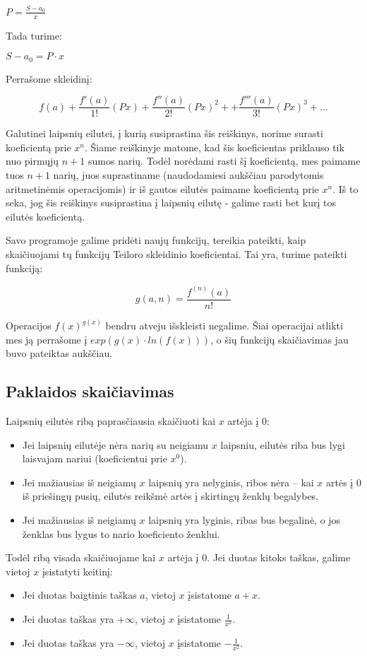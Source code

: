 	$P = \frac{S - a_0}{x}$
	
	Tada turime: 
	
	$S - a_0 = P \cdotp x$
	
	Perrašome skleidinį:
	
	\[f(a) + \frac{f'(a)}{1!}(Px)+\frac{f''(a)}{2!}(Px)^2 + +\frac{f'''(a)}{3!}(Px)^3 + ...\]
	
	Galutinei laipsnių eilutei, į kurią susiprastina šis reiškinys, norime surasti koeficientą prie $x^n$. 
	Šiame reiškinyje matome, kad šis koeficientas priklauso tik nuo pirmųjų $n+1$ sumos narių. 
	Todėl norėdami rasti šį koeficientą, mes paimame tuos $n+1$ narių, juos suprastiname (naudodamiesi aukščiau parodytomis aritmetinėmis operacijomis) 
	ir iš gautos eilutės paimame koeficientą prie $x^n$. 
	Iš to seka, jog šis reiškinys susiprastina į laipsnių eilutę - galime rasti bet kurį tos eilutės koeficientą.
	
	Savo programoje galime pridėti naujų funkcijų, tereikia pateikti, kaip skaičiuojami tų funkcijų Teiloro skleidinio koeficientai. 
	Tai yra, turime pateikti funkciją: 
	
	\[ g(a,n) = \frac{f^{(n)}(a)}{n!}\]
    
    Operacijos $f(x)^{g(x)}$ bendru atveju išskleisti negalime. Šiai operacijai atlikti mes ją perrašome į $exp(g(x) \cdotp ln(f(x)))$,
    o šių funkcijų skaičiavimas jau buvo pateiktas aukščiau.

\subsection{Paklaidos skaičiavimas}
	Laipsnių eilutės ribą paprasčiausia skaičiuoti kai $x$ artėja į 0:
	\begin{itemize}
		\item Jei laipsnių eilutėje nėra narių su neigiamu $x$ laipsniu, eilutės riba bus lygi laisvajam nariui
			(koeficientui prie $x^0$).
		\item Jei mažiausias iš neigiamų $x$ laipsnių yra nelyginis, ribos nėra -- kai $x$ artės į 0 iš priešingų pusių,
			eilutės reikšmė artės į skirtingų ženklų begalybes.
		\item Jei mažiausias iš neigiamų $x$ laipsnių yra lyginis, ribas bus begalinė, o jos ženklas bus lygus to nario
			koeficiento ženklui.
	\end{itemize}

	
	Todėl ribą visada skaičiuojame kai $x$ artėja į 0. Jei duotas kitoks taškas, galime vietoj $x$ įsistatyti keitinį:
	\begin{itemize}
		\item Jei duotas baigtinis taškas $a$, vietoj $x$ įsistatome $a + x$.
		\item Jei duotas taškas yra $+\infty$, vietoj $x$ įsistatome $\frac{1}{x^2}$.
		\item Jei duotas taškas yra $-\infty$, vietoj $x$ įsistatome $-\frac{1}{x^2}$.
	\end{itemize}



